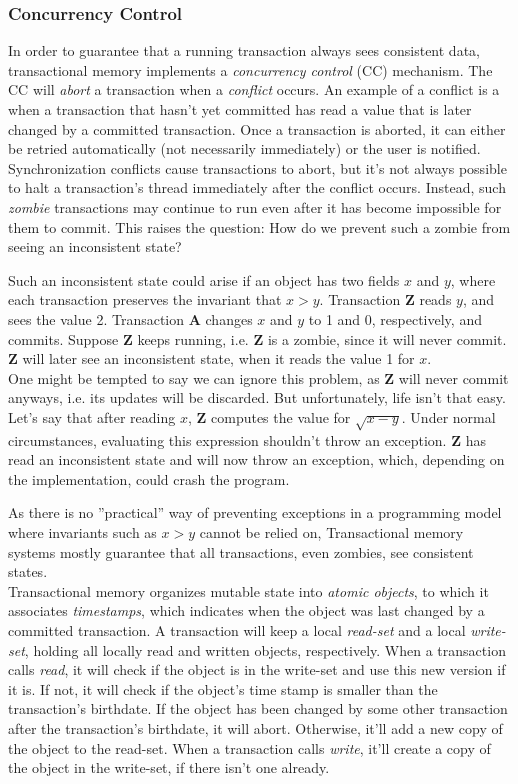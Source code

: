 \documentclass[main]{subfiles}
\begin{document}
\subsubsection{Concurrency Control}
In order to guarantee that a running transaction always sees consistent data, transactional memory implements a \textit{concurrency control} (CC) mechanism. The CC will \textit{abort} a transaction when a \textit{conflict} occurs. An example of a conflict is a when a transaction that hasn't yet committed has read a value that is later changed by a committed transaction. Once a transaction is aborted, it can either be retried automatically (not necessarily immediately) or the user is notified. \\[3mm]
Synchronization conflicts cause transactions to abort, but it's not always possible to halt a transaction's thread immediately after the conflict occurs. Instead, such \textit{zombie} transactions may continue to run even after it has become impossible for them to commit. This raises the question: How do we prevent such a zombie from seeing an inconsistent state?
\begin{example}
    Such an inconsistent state could arise if an object has two fields $x$ and $y$, where each transaction preserves the invariant that $x > y$. Transaction \textbf{Z} reads $y$, and sees the value 2. Transaction \textbf{A} changes $x$ and $y$ to 1 and 0, respectively, and commits. Suppose \textbf{Z} keeps running, i.e. \textbf{Z} is a zombie, since it will never commit. \textbf{Z} will later see an inconsistent state, when it reads the value 1 for $x$.\\[3mm]
    One might be tempted to say we can ignore this problem, as \textbf{Z} will never commit anyways, i.e. its updates will be discarded. But unfortunately, life isn't that easy. Let's say that after reading $x$, \textbf{Z} computes the value for $\sqrt{x-y}$. Under normal circumstances, evaluating this expression shouldn't throw an exception. \textbf{Z} has read an inconsistent state and will now throw an exception, which, depending on the implementation, could crash the program.
\end{example}
As there is no ''practical'' way of preventing exceptions in a programming model where invariants such as $x > y$ cannot be relied on, Transactional memory systems mostly guarantee that all transactions, even zombies, see consistent states.\\[3mm]
Transactional memory organizes mutable state into \textit{atomic objects}, to which it associates \textit{timestamps}, which indicates when the object was last changed by a committed transaction. A transaction will keep a local \textit{read-set} and a local \textit{write-set}, holding all locally read and written objects, respectively. When a transaction calls \textit{read}, it will check if the object is in the write-set and use this new version if it is. If not, it will check if the object's time stamp is smaller than the transaction's birthdate. If the object has been changed by some other transaction after the transaction's birthdate, it will abort. Otherwise, it'll add a new copy of the object to the read-set. When a transaction calls \textit{write}, it'll create a copy of the object in the write-set, if there isn't one already.\\[3mm]
\end{document}
